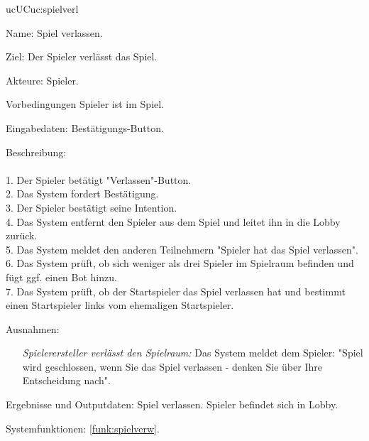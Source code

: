 \begin{description}[leftmargin=5em, style=sameline]
	\begin{lhp}{uc}{UC}{uc:spielverl}
		\item [Name:] Spiel verlassen.
		\item [Ziel:] Der Spieler verlässt das Spiel.
		\item [Akteure:] Spieler.
		\item [Vorbedingungen] Spieler ist im Spiel.
		\item [Eingabedaten:] Bestätigungs-Button.
		\item [Beschreibung:] \hfill\\ \hfill\\
			1. Der Spieler betätigt "{}Verlassen{}"{}-Button.\\
			2. Das System fordert Bestätigung.\\
			3. Der Spieler bestätigt seine Intention.\\
			4. Das System entfernt den Spieler aus dem Spiel und leitet ihn in die Lobby zurück.\\	
			5. Das System meldet den anderen Teilnehmern "Spieler hat das Spiel verlassen".\\
			6. Das System prüft, ob sich weniger als drei Spieler im Spielraum befinden und fügt ggf. einen Bot hinzu.\\
			7. Das System prüft, ob der Startspieler das Spiel verlassen hat und bestimmt einen Startspieler links vom ehemaligen Startspieler.\\
		\item [Ausnahmen:] \hfill
			\begin{itemize} 
				\item[] \textit{Spielerersteller verlässt den Spielraum:} Das System meldet dem Spieler: "{}Spiel wird geschlossen, wenn Sie das Spiel verlassen - denken Sie über Ihre Entscheidung nach{}"{}.
				
			\end{itemize}
		\item [Ergebnisse und Outputdaten:] Spiel verlassen. Spieler befindet sich in Lobby.	
		\item [Systemfunktionen:] \ref{funk:spielverw}.
	\end{lhp}


\end{description}
